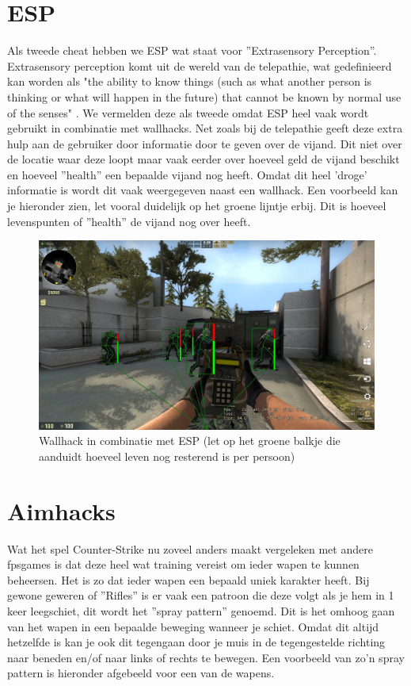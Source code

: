 \documentclass[pdftex,a4paper,12pt,twoside]{report}
\begin{document}
\section{ESP}
\label{ESP}
Als tweede \gls{cheat} hebben we ESP wat staat voor ''Extrasensory Perception''. Extrasensory perception komt uit de wereld van de telepathie, wat gedefinieerd kan worden als "the ability to know things (such as what another person is thinking or what will happen in the future) that cannot be known by normal use of the senses" \citep{extrasensoryperception}. We vermelden deze als tweede omdat ESP heel vaak wordt gebruikt in combinatie met wallhacks. Net zoals bij de telepathie geeft deze extra hulp aan de gebruiker door informatie door te geven over de vijand. Dit niet over de locatie waar deze loopt maar vaak eerder over hoeveel geld de vijand beschikt en hoeveel ''health'' een bepaalde vijand nog heeft.
Omdat dit heel 'droge' informatie is wordt dit vaak weergegeven naast een wallhack. Een voorbeeld kan je hieronder zien, let vooral duidelijk op het groene lijntje erbij. Dit is hoeveel levenspunten of ''health'' de vijand nog over heeft.

\newpage
\begin{figure}[H]
\centering
\includegraphics[width=15cm]{img/esp-example}
\caption{Wallhack in combinatie met ESP (let op het groene balkje die aanduidt hoeveel leven nog resterend is per persoon)}
\end{figure}
  
\section{Aimhacks}
\label{sec:aim}
Wat het spel Counter-Strike nu zoveel anders maakt vergeleken met andere \gls{fpsgames} is dat deze heel wat training vereist om ieder wapen te kunnen beheersen. Het is zo dat ieder wapen een bepaald uniek karakter heeft. Bij gewone geweren of ''Rifles'' is er vaak een patroon die deze volgt als je hem in 1 keer leegschiet, dit wordt het ''spray pattern'' genoemd. Dit is het omhoog gaan van het wapen in een bepaalde beweging wanneer je schiet. Omdat dit altijd hetzelfde is kan je ook dit tegengaan door je muis in de tegengestelde richting naar beneden en/of naar links of rechts te bewegen. Een voorbeeld van zo'n spray pattern is hieronder afgebeeld voor een van de wapens.
\\  
\end{document}
